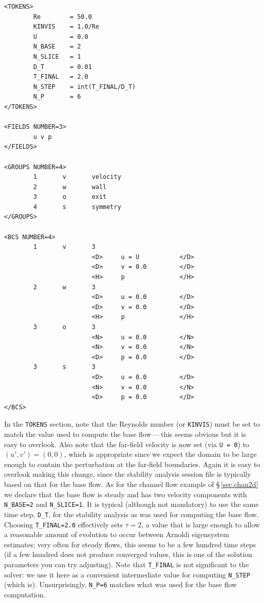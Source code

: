 \documentclass[11pt,a4paper]{report}
\begin{document}
{\small
\begin{verbatim}
<TOKENS>
        Re        = 50.0
        KINVIS    = 1.0/Re
        U         = 0.0
        N_BASE    = 2
        N_SLICE   = 1
        D_T       = 0.01
        T_FINAL   = 2.0
        N_STEP    = int(T_FINAL/D_T)
        N_P       = 6
</TOKENS>

<FIELDS NUMBER=3>
        u v p
</FIELDS>

<GROUPS NUMBER=4>
        1       v       velocity
        2       w       wall
        3       o       exit
        4       s       symmetry
</GROUPS>

<BCS NUMBER=4>
        1       v       3
                        <D>     u = U           </D>
                        <D>     v = 0.0         </D>
                        <H>     p               </H>
        2       w       3
                        <D>     u = 0.0         </D>
                        <D>     v = 0.0         </D>
                        <H>     p               </H>
        3       o       3
                        <N>     u = 0.0         </N>
                        <N>     v = 0.0         </N>
                        <D>     p = 0.0         </D>
        3       s       3
                        <D>     u = 0.0         </D>
                        <N>     v = 0.0         </N>
                        <D>     p = 0.0         </D>
</BCS>
\end{verbatim}
}
\noindent
In the \verb+TOKENS+ section, note that the Reynolds number (or
\verb+KINVIS+) must be set to match the value used to compute the base
flow\,---\,this seems obvious but it is easy to overlook. Also note
that the far-field velocity is now set (via \verb+U = 0+) to
$(u',v')=(0,0)$, which is appropriate since we expect the domain to
be large enough to contain the perturbation at the far-field
boundaries. Again it is easy to overlook making this change, since the
stability analysis session file is typically based on that for the
base flow.  As for the channel flow example of \S\,\ref{sec.chan2d} we
declare that the base flow is steady and has two velocity components
with \verb+N_BASE=2+ and \verb+N_SLICE=1+. It is typical (although
not mandatory) to use the same time step, \verb+D_T+, for the
stability analysis as was used for computing the base flow. Choosing
\verb+T_FINAL=2.0+ effectively sets $\tau=2$, a value that is large
enough to allow a reasonable amount of evolution to occur between
Arnoldi eigensystem estimates; very often for steady flows, this seems
to be a few hundred time steps (if a few hundred does not produce
converged values, this is one of the solution parameters you can try
adjusting).  Note that \verb+T_FINAL+ is not significant to the
solver: we use it here as a convenient intermediate value for
computing \verb+N_STEP+ (which is).  Unsurprisingly, \verb+N_P=6+
matches what was used for the base flow computation.
\end{document}
